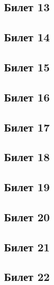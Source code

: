 \subsection{Билет 13}

\subsection{Билет 14}

\subsection{Билет 15}

\subsection{Билет 16}

\subsection{Билет 17}

\subsection{Билет 18}

\subsection{Билет 19}

\subsection{Билет 20}

\subsection{Билет 21}

\subsection{Билет 22}





